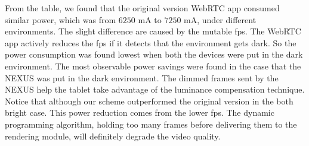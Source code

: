 From the table, we found that the original version WebRTC app consumed
similar power, which was from $6250$ mA to $7250$ mA, under different
environments. The slight difference are caused by the mutable fps. The
WebRTC app actively reduces the fps if it detects that the environment
gets dark. So the power consumption was found lowest when both the
devices were put in the dark environment. The most observable power
savings were found in the case that the NEXUS was put in the dark
environment. The dimmed frames sent by the NEXUS help the tablet take
advantage of the luminance compensation technique.  Notice that
although our scheme outperformed the original version in the both
bright case. This power reduction comes from the lower fps. The
dynamic programming algorithm, holding too many frames before
delivering them to the rendering module, will definitely degrade the
video quality.


~\cite{JSC08} %
